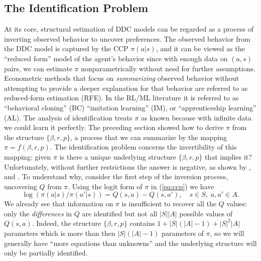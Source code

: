 \subsection{The Identification Problem}

At its core, structural estimation of DDC models can be regarded as a process of inverting observed
behavior to uncover preferences. The observed behavior from the DDC model is captured by the CCP $\pi(a|s)$, 
and it can be viewed as the  ``reduced form'' model of the agent's behavior since 
with enough data on $(a,s)$ pairs, we can estimate $\pi$ nonparametrically without need for further
assumptions.  Econometric methods that focus on {\it summarizing\/} observed behavior without attempting
to provide a deeper explanation for that behavior are
referred to as reduced-form estimation (RFE). In the RL/ML literature it is referred to as ``behavioral cloning'' (BC) 
``imitation learning'' (IM), or ``apprenticeship learning'' (AL).
The analysis of identification treats $\pi$ as known because with infinite data we could
learn it perfectly.  The preceding section showed how to derive $\pi$ from the structure $\{\beta,r,p\}$, a process that we
can summarize by the mapping $\pi=f(\beta,r,p)$. 
The identification problem concerns the invertibility of this mapping: 
given $\pi$ is there a unique underlying structure $\{\beta,r,p\}$ that implies it? Unfortunately, without
further restrictions the answer is negative, as shown by \citet{hotzmiller:1993}, 
\citet{rust:1994} and \citet{magnacthesmar:2002}. 
To understand why,  consider the first step of the inversion process, uncovering  $Q$ from $\pi$.
Using the logit form of $\pi$ in (\ref{eq:ccp}) we have
\begin{equation}
               \log\left(\pi(a|s)/\pi(a'|s)\right) = Q(s,a)-Q(s,a'), \quad s \in S, \; a,a' \in A.
\label{eq:ccpinverse}
\end{equation}
We already see that information on $\pi$ is insufficient to recover all the $Q$ values: only the {\it differences\/} in
$Q$ are identified but  not all $|S||A|$ possible values of $Q(s,a)$. Indeed, the structure $\{\beta,r,p\}$ contains $1+|S|(|A|-1)+|S|^2|A|$  
parameters which is more than then $|S|(|A|-1)$ parameters of $\pi$, so we will generally have ``more equations than unknowns'' 
and the underlying structure will only be partially identified.

